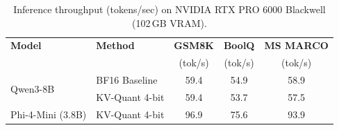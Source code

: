 \begin{table}[t]
\centering
\caption{Inference throughput (tokens/sec) on NVIDIA RTX PRO 6000 Blackwell (102\,GB VRAM).}
\label{tab:throughput}
\small
\begin{tabular}{llccc}
\toprule
\textbf{Model} & \textbf{Method} & \textbf{GSM8K} & \textbf{BoolQ} & \textbf{MS MARCO} \\
               &                 & (tok/s)        & (tok/s)        & (tok/s) \\
\midrule
\multirow{2}{*}{Qwen3-8B}
  & BF16 Baseline  & 59.4 & 54.9 & 58.9 \\
  & KV-Quant 4-bit & 59.4 & 53.7 & 57.5 \\
\midrule
Phi-4-Mini (3.8B) & KV-Quant 4-bit & 96.9 & 75.6 & 93.9 \\
\bottomrule
\end{tabular}
\end{table}


